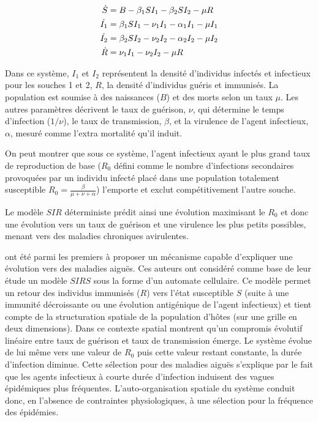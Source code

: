 \begin{align}
  \label{eq:intro_sir}
  \dot{S} &= B -\beta_1SI_1 -\beta_2SI_2 -\mu R \\
  \dot{I_1} &= \beta_1SI_1 -\nu_1 I_1 -\alpha_1 I_1 -\mu I_1 \notag \\
  \dot{I_2} &= \beta_2SI_2 -\nu_2 I_2 -\alpha_2 I_2 -\mu I_2 \notag \\
  \dot{R} &= \nu_1 I_1 -\nu_2 I_2 -\mu R \notag
\end{align}

Dans ce système, $I_1$ et $I_2$ représentent la densité d'individus
infectés et infectieux pour les souches 1 et 2, $R$, la densité
d'individus guéris et immunisés. La population est soumise à des
naissances ($B$) et des morts selon un taux $\mu$. Les autres
paramètres décrivent le taux de guérison, $\nu$, qui détermine le
temps d'infection ($1/ \nu$), le taux de transmission, $\beta$, et la
virulence de l'agent infectieux, $\alpha$, mesuré comme l'extra
mortalité qu'il induit.

On peut montrer que sous ce système, l'agent infectieux ayant le plus
grand taux de reproduction de base ($R_0$ défini comme le nombre
d'infections secondaires provoquées par un individu infecté placé dans
une population totalement susceptible $R_0=\frac{\beta}{\mu + \nu
  +\alpha}$) l'emporte et exclut compétitivement l'autre souche.

Le modèle $SIR$ déterministe prédit ainsi une évolution maximisant le
$R_0$ et donc une évolution vers un taux de guérison et une virulence
les plus petits possibles, menant vers des maladies chroniques
avirulentes.

\citet{Ballegooijen2004} ont été parmi les premiers à proposer un
mécanisme capable d'expliquer une évolution vers des maladies aiguës.
Ces auteurs ont considéré comme base de leur étude un modèle $SIRS$
sous la forme d'un automate cellulaire. Ce modèle permet un retour des
individus immunisés ($R$) vers l'état susceptible $S$ (suite à une
immunité décroissante ou une évolution antigénique de l'agent
infectieux) et tient compte de la structuration spatiale de la
population d'hôtes (sur une grille en deux dimensions). Dans ce
contexte spatial \citet{Ballegooijen2004} montrent qu'un compromis
évolutif linéaire entre taux de guérison et taux de transmission
émerge. Le système évolue de lui même vers une valeur de $R_0$ puis
cette valeur restant constante, la durée d'infection diminue. Cette
sélection pour des maladies aiguës s'explique par le fait que les
agents infectieux à courte durée d'infection induisent des vagues
épidémiques plus fréquentes. L'auto-organisation spatiale du système
conduit donc, en l'absence de contraintes physiologiques, à une
sélection pour la fréquence des épidémies.

